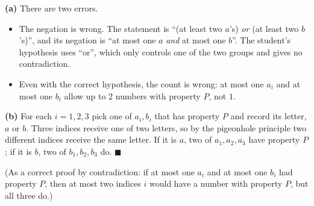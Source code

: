 \textbf{(a)} There are two errors.
\begin{itemize}
\item The negation is wrong. The statement is ``(at least two $a$'s) \emph{or} (at least two $b$'s)'', and its negation is ``at most one $a$ \emph{and} at most one $b$''. The student's hypothesis uses ``or'', which only controls one of the two groups and gives no contradiction.
\item Even with the correct hypothesis, the count is wrong: at most one $a_i$ and at most one $b_i$ allow up to $2$ numbers with property $P$, not $1$.
\end{itemize}

\textbf{(b)} For each $i=1,2,3$ pick one of $a_i,b_i$ that has property $P$ and record its letter, $a$ or $b$. Three indices receive one of two letters, so by the pigeonhole principle two different indices receive the same letter. If it is $a$, two of $a_1,a_2,a_3$ have property $P$; if it is $b$, two of $b_1,b_2,b_3$ do. $\blacksquare$

(As a correct proof by contradiction: if at most one $a_i$ and at most one $b_i$ had property $P$, then at most two indices $i$ would have a number with property $P$, but all three do.)
